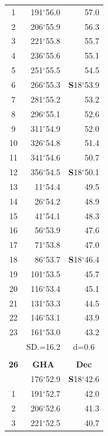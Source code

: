 \documentclass[10pt, a4paper]{report}
\begin{document}
\begin{scriptsize}
\begin{tabular*}{0.2\textwidth}[t]{@{\extracolsep{\fill}}|c|rr|}
1 & 191$^\circ$56.0 & 57.0\\
2 & 206$^\circ$55.9 & 56.3\\
3 & 221$^\circ$55.8 & \raisebox{0.24ex}{\boldmath$\cdot$~\boldmath$\cdot$~~}55.7\\
4 & 236$^\circ$55.6 & 55.1\\
5 & 251$^\circ$55.5 & 54.5\\[2Pt]
6 & 266$^\circ$55.3 & \textbf{S}18$^\circ$53.9\\
7 & 281$^\circ$55.2 & 53.2\\
8 & 296$^\circ$55.1 & 52.6\\
9 & 311$^\circ$54.9 & \raisebox{0.24ex}{\boldmath$\cdot$~\boldmath$\cdot$~~}52.0\\
10 & 326$^\circ$54.8 & 51.4\\
11 & 341$^\circ$54.6 & 50.7\\[2Pt]
12 & 356$^\circ$54.5 & \textbf{S}18$^\circ$50.1\\
13 & 11$^\circ$54.4 & 49.5\\
14 & 26$^\circ$54.2 & 48.9\\
15 & 41$^\circ$54.1 & \raisebox{0.24ex}{\boldmath$\cdot$~\boldmath$\cdot$~~}48.3\\
16 & 56$^\circ$53.9 & 47.6\\
17 & 71$^\circ$53.8 & 47.0\\[2Pt]
18 & 86$^\circ$53.7 & \textbf{S}18$^\circ$46.4\\
19 & 101$^\circ$53.5 & 45.7\\
20 & 116$^\circ$53.4 & 45.1\\
21 & 131$^\circ$53.3 & \raisebox{0.24ex}{\boldmath$\cdot$~\boldmath$\cdot$~~}44.5\\
22 & 146$^\circ$53.1 & 43.9\\
23 & 161$^\circ$53.0 & 43.2\\
\hline
\rule{0pt}{2.4ex} & \multicolumn{1}{c}{SD.=16.2} & \multicolumn{1}{c|}{d=0.6}\\
\hline
\multicolumn{1}{c}{}\\[-0.5ex]\hline
\multicolumn{1}{|c|}{\rule{0pt}{2.6ex}\textbf{26}} & \multicolumn{1}{c}{\textbf{GHA}} & \multicolumn{1}{c|}{\textbf{Dec}}\\
\hline\rule{0pt}{2.6ex}\noindent
0 & 176$^\circ$52.9 & \textbf{S}18$^\circ$42.6\\
1 & 191$^\circ$52.7 & 42.0\\
2 & 206$^\circ$52.6 & 41.3\\
3 & 221$^\circ$52.5 & \raisebox{0.24ex}{\boldmath$\cdot$~\boldmath$\cdot$~~}40.7\\

\end{tabular*}
\end{scriptsize}
\end{document}
